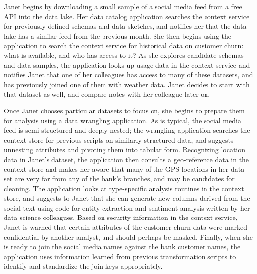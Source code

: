 \documentclass{sig-alternate}
\begin{document}
Janet 
begins by downloading a small sample of a social media feed from a free API into the data lake. Her data catalog application searches the context service for previously-defined schemas and data sketches, and notifies her that the data lake has a similar feed from the previous month. 
She then begins using the application to search the context service for historical data on customer churn: what is available, and who has access to it?  As she explores candidate schemas and data samples, the application looks up usage data in the context service and notifies Janet that one of her colleagues has access to many of these datasets, and has previously joined one of them with weather data. Janet decides to start with that dataset as well, and compare notes with her colleague later on.  

Once Janet chooses particular datasets to focus on, she begins to prepare them for analysis using a data wrangling application. As is typical, the social media feed is semi-structured and deeply nested; the wrangling application searches the context store for previous scripts on similarly-structured data, and suggests unnesting attributes and pivoting them into tabular form.  Recognizing location data in Janet's dataset, the application then consults a geo-reference data in the context store and makes her aware that many of the GPS locations in her data set are very far from any of the bank's branches, and may be candidates for cleaning. The application looks at type-specific analysis routines in the context store, and suggests to Janet that she can generate new columns derived from the social text using code for entity extraction and sentiment analysis written by her data science colleagues. Based on security information in the context service, Janet is warned that certain attributes of the customer churn data were marked confidential by another analyst, and should perhaps be masked. Finally, when she is ready to join the social media names against the bank customer names, the application uses information learned from previous transformation scripts to identify and standardize the join keys appropriately. 
\end{document}
